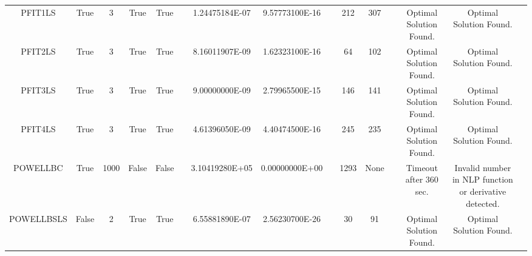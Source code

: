 \begin{longtable}{ccccccccccccccc}
	\cellcolor{default2} PFIT1LS& \cellcolor{default2} True& \cellcolor{default2} 3& \cellcolor{default2} True& \cellcolor{default2} True& \cellcolor{header} & \cellcolor{ok} 1.24475184E-07& \cellcolor{best} 9.57773100E-16& \cellcolor{header} & \cellcolor{best} 212& \cellcolor{ok} 307& \cellcolor{header} & \cellcolor{default2} Optimal Solution Found.& \cellcolor{default2} Optimal Solution Found.& \cellcolor{header} \\
	\cellcolor{default1} PFIT2LS& \cellcolor{default1} True& \cellcolor{default1} 3& \cellcolor{default1} True& \cellcolor{default1} True& \cellcolor{header} & \cellcolor{ok} 8.16011907E-09& \cellcolor{best} 1.62323100E-16& \cellcolor{header} & \cellcolor{best} 64& \cellcolor{ok} 102& \cellcolor{header} & \cellcolor{default1} Optimal Solution Found.& \cellcolor{default1} Optimal Solution Found.& \cellcolor{header} \\
	\cellcolor{default2} PFIT3LS& \cellcolor{default2} True& \cellcolor{default2} 3& \cellcolor{default2} True& \cellcolor{default2} True& \cellcolor{header} & \cellcolor{ok} 9.00000000E-09& \cellcolor{best} 2.79965500E-15& \cellcolor{header} & \cellcolor{ok} 146& \cellcolor{best} 141& \cellcolor{header} & \cellcolor{default2} Optimal Solution Found.& \cellcolor{default2} Optimal Solution Found.& \cellcolor{header} \\
	\cellcolor{default1} PFIT4LS& \cellcolor{default1} True& \cellcolor{default1} 3& \cellcolor{default1} True& \cellcolor{default1} True& \cellcolor{header} & \cellcolor{ok} 4.61396050E-09& \cellcolor{best} 4.40474500E-16& \cellcolor{header} & \cellcolor{ok} 245& \cellcolor{best} 235& \cellcolor{header} & \cellcolor{default1} Optimal Solution Found.& \cellcolor{default1} Optimal Solution Found.& \cellcolor{header} \\
	\cellcolor{default2} POWELLBC& \cellcolor{default2} True& \cellcolor{default2} 1000& \cellcolor{default2} False& \cellcolor{default2} False& \cellcolor{header} & \cellcolor{poor} 3.10419280E+05& \cellcolor{best} 0.00000000E+00& \cellcolor{header} & \cellcolor{best} 1293& \cellcolor{err} None& \cellcolor{header} & \cellcolor{default2} Timeout after 360 sec.& \cellcolor{default2} Invalid number in NLP function or derivative detected.& \cellcolor{header} \\
	\cellcolor{default1} POWELLBSLS& \cellcolor{default1} False& \cellcolor{default1} 2& \cellcolor{default1} True& \cellcolor{default1} True& \cellcolor{header} & \cellcolor{ok} 6.55881890E-07& \cellcolor{best} 2.56230700E-26& \cellcolor{header} & \cellcolor{best} 30& \cellcolor{poor} 91& \cellcolor{header} & \cellcolor{default1} Optimal Solution Found.& \cellcolor{default1} Optimal Solution Found.& \cellcolor{header} \\

\end{longtable}
